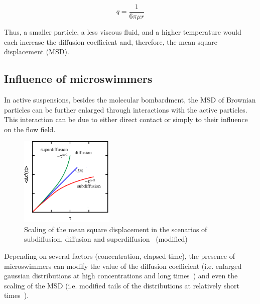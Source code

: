 \begin{equation}
q=\frac{1}{6 \pi \mu r}
\end{equation}

Thus, a smaller particle, a less viscous fluid, and a higher temperature would each increase the diffusion coefficient and, therefore, the mean square displacement (MSD). 

\subsection{Influence of microswimmers}

In active suspensions, besides the molecular bombardment, the MSD of Brownian particles can be further enlarged through interactions with the active particles. This interaction can be due to either direct contact or simply to their influence on the flow field.

\begin{figure}[H]
	\centering
	\includegraphics[width=0.4\textwidth]{archivos/SubSuperDif.png}
	\caption{Scaling of the mean square displacement in the scenarios of subdiffusion, diffusion and superdiffusion~\cite{MacKintosh7138} (modified)}
	\label{SSDif}
\end{figure}

Depending on several factors (concentration, elapsed time), the presence of microswimmers can modify the value of the diffusion coefficient (i.e. enlarged gaussian distributions at high concentrations and long times~\cite{Kurtuldu2011}) and even the scaling of the MSD (i.e. modified tails of the distributions at relatively short times~\cite{Kurtuldu2011}). 